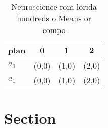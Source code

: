 \documentclass[a4paper]{article}
\begin{document}
\begin{table}
\begin{adjustbox}{width=0.6\columnwidth}
\begin{tabular}{|l|l|l|l|}
\hline
\textbf{plan} & \multicolumn{1}{c|}{\textbf{0}} & \multicolumn{1}{c|}{\textbf{1}} & \multicolumn{1}{c|}{\textbf{2}} \\ \hline
\textbf{$a_0$}  & (0,0) & (1,0) & (2,0) \\ \hline
\textbf{$a_1$}  & (0,0) & (1,0) & (2,0) \\ \hline
\end{tabular}
\end{adjustbox}
\caption{Neuroscience rom lorida hundreds o Means or compo
}
\end{table}

\section{Section}
\end{document}
